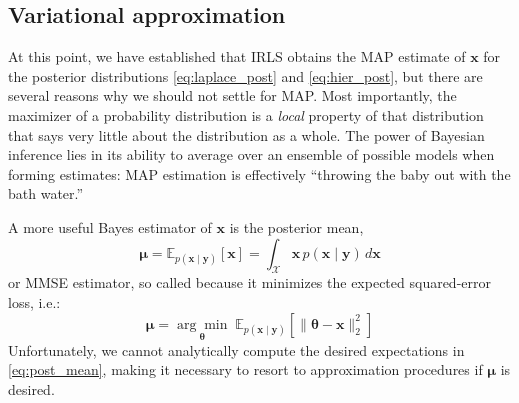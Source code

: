 \documentclass[final,5p,times,twocolumn]{elsarticle}
\newcommand{\m}[1]{\boldsymbol{#1}}
\newcommand{\E}[2]{\mathbb{E}_{#2}\left[ #1 \right]}
\begin{document}
\subsection{Variational approximation}
\label{ss:vb}
At this point, we have established that IRLS obtains the MAP estimate of
$\m{x}$ for the posterior distributions \eqref{eq:laplace_post} and
\eqref{eq:hier_post}, but there are several reasons why we should
not settle for MAP. Most importantly, the maximizer of a probability
distribution is a \emph{local} property of that distribution that says
very little about the distribution as a whole. The power of Bayesian
inference lies in its ability to average over an ensemble of possible
models when forming estimates: MAP estimation is effectively ``throwing
the baby out with the bath water.''

A more useful Bayes estimator of $\m{x}$ is the posterior mean,
\begin{equation}
\m{\mu} =
 \E{\m{x}}{p(\m{x} \mid \m{y})} =
 \int_{\mathcal{X}} \m{x} \, p(\m{x} \mid \m{y}) \, d\m{x}
\label{eq:post_mean}
\end{equation}
or MMSE estimator, so called because it minimizes the expected
squared-error loss, i.e.:
\begin{equation}
\m{\mu} =
 \underset{\m{\theta}}{\arg\min} \;
 \E{\| \m{\theta} - \m{x} \|_2^2}{p(\m{x} \mid \m{y})}
\label{eq:mmse}
\end{equation}
Unfortunately, we cannot analytically compute the desired expectations
in \eqref{eq:post_mean}, making it necessary to resort to approximation
procedures if $\m{\mu}$ is desired.
\end{document}
